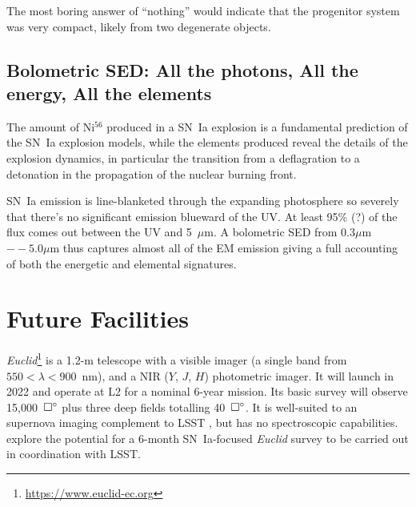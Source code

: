 \documentclass[12pt,preprint]{aastex}
\newcommand{\snia}{SN~Ia\xspace}
\newcommand{\tbd}{{\color{red}}}
\begin{document}
The most boring answer of ``nothing'' would indicate that the progenitor system was very compact, likely from two degenerate objects.

\iffalse
\subsection{Current Limits from K2, ASASSN Supernovae}

{\tbd Quote and describe the current work with early-time lightcurves from K2, ASASSN}

{\tbd If something comes out of ZTF, add that here.}
\fi

\subsection{Bolometric SED: All the photons, All the energy, All the elements}
The amount of Ni$^{56}$ produced in a SN~Ia explosion is a fundamental prediction of the SN~Ia explosion models, while the elements produced reveal the details of the explosion dynamics, in particular the transition from a deflagration to a detonation in the propagation of the nuclear burning front.

SN~Ia emission is line-blanketed through the expanding photosphere so severely that there's no significant emission blueward of the UV.  At least 95\% (?) of the flux comes out between the UV and 5~$\mu$m.  A bolometric SED from $0.3\mu$m$--5.0\mu$m thus captures almost all of the EM emission giving a full accounting of both the energetic and elemental signatures.




\section{Future Facilities}

{\it Euclid}\footnote{\url{https://www.euclid-ec.org}} is a 1.2-m telescope with a visible imager (a single band from $550<\lambda<900$~nm), and a NIR ($Y$, $J$, $H$) photometric imager.  It will launch in 2022 and operate at L2 for a nominal 6-year mission.  Its basic survey will observe 15,000~$\square\mbox{$^\circ$}$ plus three deep fields totalling 40~$\square\mbox{$^\circ$}$.  It is well-suited to an supernova imaging complement to LSST \citep{Astier14}, but has no spectroscopic capabilities.  \citet{Astier14} explore the potential for a 6-month \snia-focused {\it Euclid} survey to be carried out in coordination with LSST.
\end{document}
